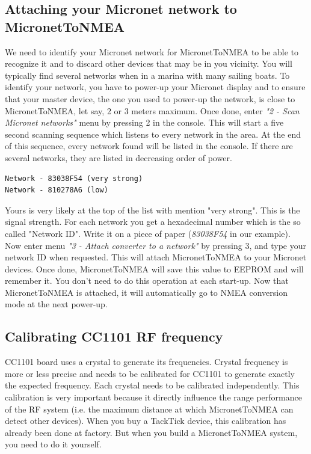 \documentclass{report}
\begin{document}
\subsection{Attaching your Micronet network to MicronetToNMEA}

We need to identify your Micronet network for MicronetToNMEA to be able to recognize it and to discard other devices that may be in you vicinity. You will typically find several networks when in a marina with many sailing boats.
To identify your network, you have to power-up your Micronet display and to ensure that your master device, the one you used to power-up the network, is close to MicronetToNMEA, let say, 2 or 3 meters maximum. Once done, enter \emph{"2 - Scan Micronet networks"} menu by pressing 2 in the console. This will start a five second scanning sequence which listens to every network in the area. At the end of this sequence, every network found will be listed in the console. If there are several networks, they are listed in decreasing order of power.

\begin{verbatim}
Network - 83038F54 (very strong)
Network - 810278A6 (low)
\end{verbatim}

Yours is very likely at the top of the list with mention "very strong". This is the signal strength. For each network you get a hexadecimal number which is the so called "Network ID". Write it on a piece of paper (\emph{83038F54} in our example).
Now enter menu \emph{"3 - Attach converter to a network"} by pressing 3, and type your network ID when requested. This will attach MicronetToNMEA to your Micronet devices.
Once done, MicronetToNMEA will save this value to EEPROM and will remember it. You don't need to do this operation at each start-up. Now that MicronetToNMEA is attached, it will automatically go to NMEA conversion mode at the next power-up.

\subsection{Calibrating CC1101 RF frequency}

CC1101 board uses a crystal to generate its frequencies. Crystal frequency is more or less precise and needs to be calibrated for CC1101 to generate exactly the expected frequency. Each crystal needs to be calibrated independently. This calibration is very important because it directly influence the range performance of the RF system (i.e. the maximum distance at which MicronetToNMEA can detect other devices). When you buy a TackTick device, this calibration has already been done at factory. But when you build a MicronetToNMEA system, you need to do it yourself.
\end{document}
